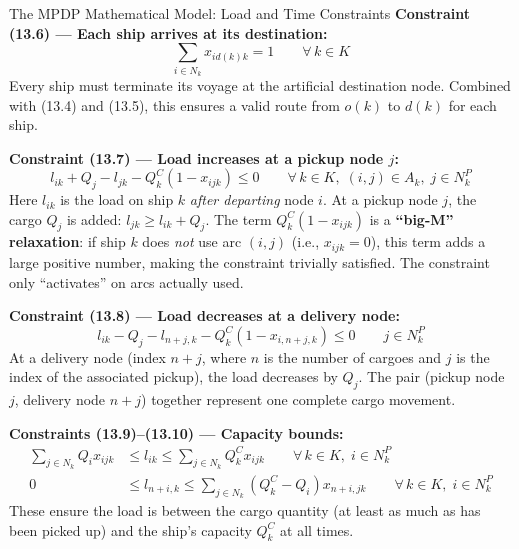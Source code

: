 \documentclass[aspectratio=169,10pt]{beamer}
\begin{document}
\begin{frame}[allowframebreaks]{The MPDP Mathematical Model: Load and Time Constraints}
  \textbf{Constraint (13.6) --- Each ship arrives at its destination:}
  \begin{equation}
    \sum_{i \in N_k} x_{id(k)k} = 1 \qquad \forall\, k \in K
    \tag{13.6}
  \end{equation}
  Every ship must terminate its voyage at the artificial destination node.
  Combined with (13.4) and (13.5), this ensures a valid route from $o(k)$
  to $d(k)$ for each ship.

  \medskip
  \textbf{Constraint (13.7) --- Load increases at a pickup node $j$:}
  \begin{equation}
    l_{ik} + Q_j - l_{jk} - Q_k^C (1 - x_{ijk}) \leq 0
    \qquad \forall\, k \in K,\; (i,j) \in A_k,\; j \in N_k^P
    \tag{13.7}
  \end{equation}
  Here $l_{ik}$ is the load on ship $k$ \emph{after departing} node $i$.
  At a pickup node $j$, the cargo $Q_j$ is added: $l_{jk} \geq l_{ik} + Q_j$.
  The term $Q_k^C (1 - x_{ijk})$ is a \textbf{``big-M'' relaxation}: if ship $k$
  does \emph{not} use arc $(i,j)$ (i.e., $x_{ijk}=0$), this term adds a large
  positive number, making the constraint trivially satisfied.  The constraint
  only ``activates'' on arcs actually used.

  \medskip
  \textbf{Constraint (13.8) --- Load decreases at a delivery node:}
  \begin{equation}
    l_{ik} - Q_j - l_{n+j,k} - Q_k^C (1 - x_{i,n+j,k}) \leq 0
    \qquad j \in N_k^P
    \tag{13.8}
  \end{equation}
  At a delivery node (index $n+j$, where $n$ is the number of cargoes and
  $j$ is the index of the associated pickup), the load decreases by $Q_j$.
  The pair (pickup node $j$, delivery node $n+j$) together represent one
  complete cargo movement.

  \medskip
  \textbf{Constraints (13.9)--(13.10) --- Capacity bounds:}
  \begin{align}
    \sum_{j \in N_k} Q_i x_{ijk} &\leq l_{ik} \leq \sum_{j \in N_k} Q_k^C x_{ijk}
    \qquad \forall\, k \in K,\; i \in N_k^P \tag{13.9} \\
    0 &\leq l_{n+i,k} \leq \sum_{j \in N_k} (Q_k^C - Q_i) x_{n+i,jk}
    \qquad \forall\, k \in K,\; i \in N_k^P \tag{13.10}
  \end{align}
  These ensure the load is between the cargo quantity (at least as much as
  has been picked up) and the ship's capacity $Q_k^C$ at all times.


\end{frame}
\end{document}
